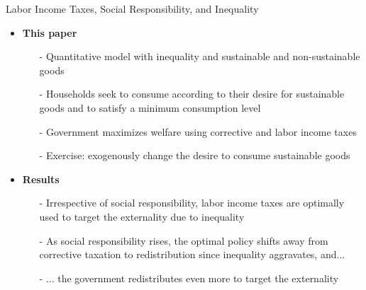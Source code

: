 \begin{frame}{Labor Income Taxes, Social Responsibility, and Inequality}
	
	\begin{itemize}[<+->]
		\item \textbf{This paper}
		\begin{itemize}
			\item[-] Quantitative model with inequality and {sustainable} and {non-sustainable} goods
			\item[-] Households seek to consume according to their desire for sustainable goods and to satisfy a minimum consumption level
			\item[-] Government maximizes welfare using corrective and labor income taxes
			\item[-] Exercise: exogenously change the desire to consume {sustainable} goods
		\end{itemize}
		\item \textbf{Results}	
		\begin{itemize}
			\item[-] Irrespective of social responsibility, labor income taxes are optimally used to target the externality due to inequality
			\item[-] As social responsibility rises, the optimal policy shifts away from corrective taxation to redistribution since inequality aggravates, and...
			\item[-] ... the government redistributes even more to target the externality
		\end{itemize}
				
		\end{itemize}
	\end{frame}

